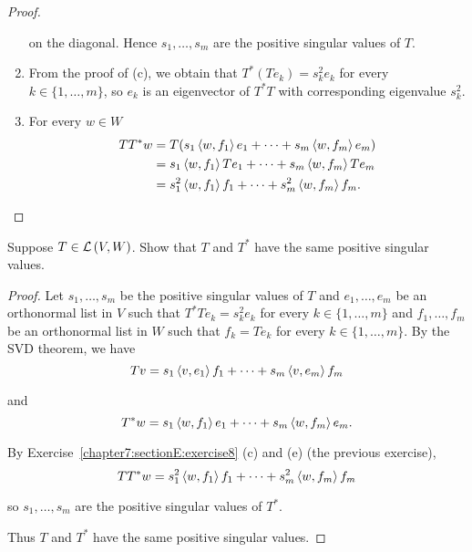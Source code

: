 \begin{proof}
\begin{enumerate}[label={(\alph*)}]
              on the diagonal. Hence $s_{1}, \ldots, s_{m}$ are the positive singular values of $T$.
        \item From the proof of (c), we obtain that $T^{*}(Te_{k}) = s_{k}^{2}e_{k}$ for every $k\in\{1,\ldots,m\}$, so $e_{k}$ is an eigenvector of $T^{*}T$ with corresponding eigenvalue $s_{k}^{2}$.
        \item For every $w\in W$
              \begin{align*}
                  TT^{*}w & = T(s_{1}\left\langle{w, f_{1}}\right\rangle e_{1} + \cdots + s_{m}\left\langle{w, f_{m}}\right\rangle e_{m})     \\
                          & = s_{1}\left\langle{w,f_{1}}\right\rangle Te_{1} + \cdots + s_{m}\left\langle{w,f_{m}}\right\rangle Te_{m}        \\
                          & = s_{1}^{2}\left\langle{w,f_{1}}\right\rangle f_{1} + \cdots + s_{m}^{2}\left\langle{w,f_{m}}\right\rangle f_{m}.
              \end{align*}
    \end{enumerate}
\end{proof}
\newpage

\begin{exercise}
    Suppose $T\in\mathcal{L}\left({V, W}\right)$. Show that $T$ and $T^{*}$ have the same positive singular values.
\end{exercise}

\begin{proof}
    Let $s_{1}, \ldots, s_{m}$ be the positive singular values of $T$ and $e_{1}, \ldots, e_{m}$ be an orthonormal list in $V$ such that $T^{*}Te_{k} = s_{k}^{2}e_{k}$ for every $k\in\{1,\ldots,m\}$ and $f_{1}, \ldots, f_{m}$ be an orthonormal list in $W$ such that $f_{k} = Te_{k}$ for every $k\in\{1,\ldots,m\}$. By the SVD theorem, we have
    \[
        Tv = s_{1}\left\langle{v,e_{1}}\right\rangle f_{1} + \cdots + s_{m}\left\langle{v,e_{m}}\right\rangle f_{m}
    \]

    and
    \[
        T^{*}w = s_{1}\left\langle{w, f_{1}}\right\rangle e_{1} + \cdots + s_{m}\left\langle{w, f_{m}}\right\rangle e_{m}.
    \]

    By Exercise~\ref{chapter7:sectionE:exercise8} (c) and (e) (the previous exercise),
    \[
        TT^{*}w = s_{1}^{2}\left\langle{w,f_{1}}\right\rangle f_{1} + \cdots + s_{m}^{2}\left\langle{w,f_{m}}\right\rangle f_{m}
    \]

    so $s_{1}, \ldots, s_{m}$ are the positive singular values of $T^{*}$.

    Thus $T$ and $T^{*}$ have the same positive singular values.
\end{proof}
\newpage

